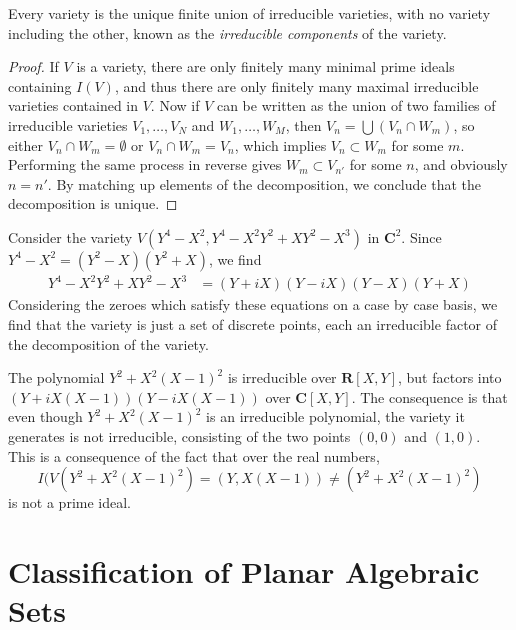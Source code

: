 \begin{theorem}
    Every variety is the unique finite union of irreducible varieties, with no variety including the other, known as the {\it irreducible components} of the variety.
\end{theorem}
\begin{proof}
    If $V$ is a variety, there are only finitely many minimal prime ideals containing $I(V)$, and thus there are only finitely many maximal irreducible varieties contained in $V$. Now if $V$ can be written as the union of two families of irreducible varieties $V_1, \dots, V_N$ and $W_1, \dots, W_M$, then $V_n = \bigcup (V_n \cap W_m)$, so either $V_n \cap W_m = \emptyset$ or $V_n \cap W_m = V_n$, which implies $V_n \subset W_m$ for some $m$. Performing the same process in reverse gives $W_m \subset V_{n'}$ for some $n$, and obviously $n = n'$. By matching up elements of the decomposition, we conclude that the decomposition is unique.
\end{proof}

\begin{example}
    Consider the variety $V(Y^4 - X^2, Y^4 - X^2Y^2 + XY^2 - X^3)$ in $\mathbf{C}^2$. Since $Y^4 - X^2 = (Y^2 - X)(Y^2 + X)$, we find
    \begin{align*}
        Y^4 - X^2Y^2 + XY^2 - X^3 &= (Y + iX)(Y - iX)(Y-X)(Y+X)
    \end{align*}
    Considering the zeroes which satisfy these equations on a case by case basis, we find that the variety is just a set of discrete points, each an irreducible factor of the decomposition of the variety.
\end{example}

\begin{example}
    The polynomial $Y^2 + X^2(X-1)^2$ is irreducible over $\mathbf{R}[X,Y]$, but factors into $(Y + iX(X-1))(Y - iX(X-1))$ over $\mathbf{C}[X,Y]$. The consequence is that even though $Y^2 + X^2(X-1)^2$ is an irreducible polynomial, the variety it generates is not irreducible, consisting of the two points $(0,0)$ and $(1,0)$. This is a consequence of the fact that over the real numbers,
    \[ I(V(Y^2 + X^2(X-1)^2) = (Y,X(X-1)) \neq (Y^2 + X^2(X - 1)^2) \]
    is not a prime ideal.
\end{example}

\section{Classification of Planar Algebraic Sets}

